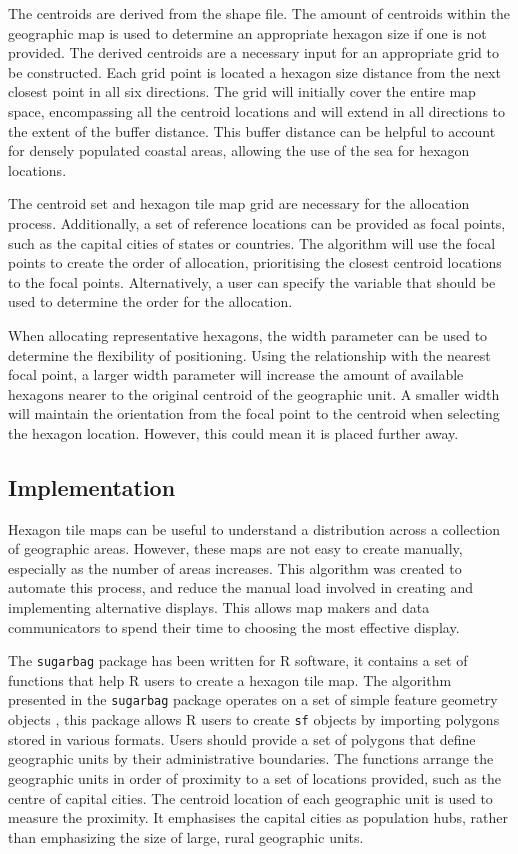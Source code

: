 The centroids are derived from the shape file. The amount of centroids
within the geographic map is used to determine an appropriate hexagon
size if one is not provided. The derived centroids are a necessary input
for an appropriate grid to be constructed. Each grid point is located a
hexagon size distance from the next closest point in all six directions.
The grid will initially cover the entire map space, encompassing all the
centroid locations and will extend in all directions to the extent of
the buffer distance. This buffer distance can be helpful to account for
densely populated coastal areas, allowing the use of the sea for hexagon
locations.

The centroid set and hexagon tile map grid are necessary for the
allocation process. Additionally, a set of reference locations can be
provided as focal points, such as the capital cities of states or
countries. The algorithm will use the focal points to create the order
of allocation, prioritising the closest centroid locations to the focal
points. Alternatively, a user can specify the variable that should be
used to determine the order for the allocation.

When allocating representative hexagons, the width parameter can be used
to determine the flexibility of positioning. Using the relationship with
the nearest focal point, a larger width parameter will increase the
amount of available hexagons nearer to the original centroid of the
geographic unit. A smaller width will maintain the orientation from the
focal point to the centroid when selecting the hexagon location.
However, this could mean it is placed further away.

\hypertarget{implementation}{%
\subsection{Implementation}\label{implementation}}

Hexagon tile maps can be useful to understand a distribution across a
collection of geographic areas. However, these maps are not easy to
create manually, especially as the number of areas increases. This
algorithm was created to automate this process, and reduce the manual
load involved in creating and implementing alternative displays. This
allows map makers and data communicators to spend their time to choosing
the most effective display.

The \texttt{sugarbag} package has been written for R software, it
contains a set of functions that help R users to create a hexagon tile
map. The algorithm presented in the \texttt{sugarbag} package operates
on a set of simple feature geometry objects \citep{sf}, this package
allows R users to create \texttt{sf} objects by importing polygons
stored in various formats. Users should provide a set of polygons that
define geographic units by their administrative boundaries. The
functions arrange the geographic units in order of proximity to a set of
locations provided, such as the centre of capital cities. The centroid
location of each geographic unit is used to measure the proximity. It
emphasises the capital cities as population hubs, rather than
emphasizing the size of large, rural geographic units.

